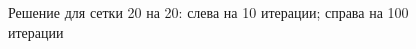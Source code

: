 \documentclass[12pt]{article}
\begin{document}
\begin{figure}[htb!]
\begin{minipage}[h]{0.49\linewidth}
\end{minipage}
\hfill
\begin{minipage}[h]{0.49\linewidth}
\end{minipage}
\caption{Решение для сетки 20 на 20: слева на 10 итерации; справа на 100 итерации}
\end{figure}
\end{document}
